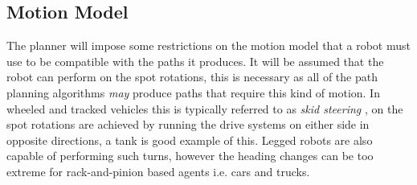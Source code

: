 \subsection{Motion Model}
\noindent
The planner will impose some restrictions on the motion model that a robot must use to be compatible with the paths it produces. It will be assumed that the robot can perform on the spot rotations, this is necessary as all of the path planning algorithms \textit{may} produce paths that require this kind of motion. In wheeled and tracked vehicles this is typically referred to as \textit{skid steering} \cite{building robot drive trains}, on the spot rotations are achieved by running the drive systems on either side in opposite directions, a tank is good example of this. Legged robots are also capable of performing such turns, however the heading changes can be too extreme for rack-and-pinion based agents i.e. cars and trucks. 

\newpage

